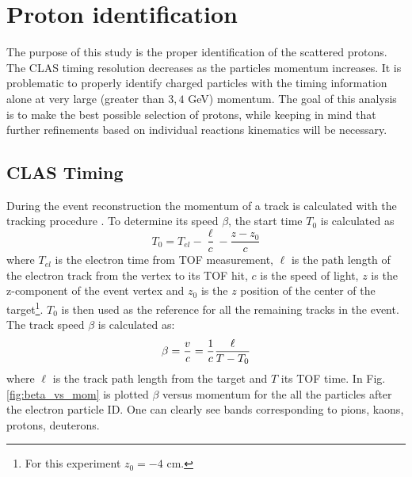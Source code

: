 \section{Proton identification}

The purpose of this study is the proper identification of the
scattered protons. The CLAS timing resolution decreases as the
particles momentum increases. It is problematic to properly identify
charged particles with the timing  information alone at very large (greater than $3, 4$ GeV) momentum.
The goal of this analysis is to make the best possible selection of protons, while keeping
in mind that further refinements based on individual reactions kinematics will be necessary.



\subsection{CLAS Timing}
\label{sec:clas_timing}


During the event reconstruction the momentum of a track is calculated 
with the tracking procedure \cite{bib:tracking}. To determine its speed $\beta$,
the start time $T_0$ is calculated as
\begin{equation}
 T_0 = T_{el} - \frac{\ell}{c} - \frac{z-z_0}{c}
\end{equation}
where $T_{el}$ is the electron time from TOF measurement, $\ell$ is the
path length of the electron track from the vertex to its TOF hit, $c$ is
the speed of light, $z$ is the z-component of the event vertex and $z_0$ 
is the $z$ position of the center of the 
target\footnote{For this experiment $z_0 = -4$ cm.}. $T_0$ is then used 
as the reference for all the remaining tracks in the event. The track speed $\beta$ 
is calculated as:
\begin{equation}
 \beta = \frac{v}{\it c} = \frac{1}{c} \frac{\ell}{T-T_0}
\end{equation}
where $\ell$ is the track path length from the target and $T$ its TOF time.
In  Fig.\ref{fig:beta_vs_mom} is plotted $\beta$ versus momentum for the all the 
particles after the electron particle ID. One can clearly see bands corresponding 
to pions, kaons, protons, deuterons.


